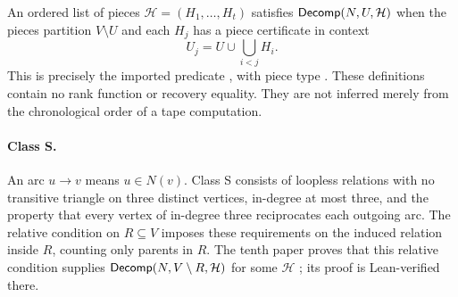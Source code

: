 An ordered list of pieces $\mathcal H=(H_1,\ldots,H_t)$ satisfies
$\mathsf{Decomp}(N,U,\mathcal H)$ when the pieces partition $V\setminus U$
and each $H_j$ has a piece certificate in context
\[
U_j=U\cup\bigcup_{i<j}H_i.
\]
This is precisely the imported predicate
, with piece type
. These definitions contain no rank
function or recovery equality. They are not inferred merely from the
chronological order of a tape computation.

\paragraph{Class S.}
An arc $u\to v$ means $u\in N(v)$. Class S consists of loopless
relations with no transitive triangle on three distinct vertices,
in-degree at most three, and the property that every vertex of
in-degree three reciprocates each outgoing arc. The relative condition
on $R\subseteq V$ imposes these requirements on the induced relation
inside $R$, counting only parents in $R$. The tenth paper proves that
this relative condition supplies
$\mathsf{Decomp}(N,V\setminus R,\mathcal H)$ for some $\mathcal H$
\cite[Theorem S*]{TenthPaper2026}; its proof is Lean-verified there.
